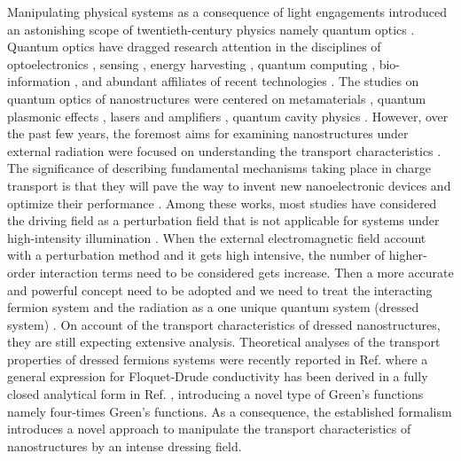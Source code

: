 
Manipulating physical systems as a consequence of light engagements introduced an astonishing scope of twentieth-century physics namely quantum optics \cite{grynberg10}.
Quantum optics have dragged research attention in the disciplines of optoelectronics \cite{liu16,wijesekara20,tao21}, sensing \cite{rodrigo2015,pirandola18,hapuarachchi2018}, energy harvesting \cite{yuan16,sun18},
quantum computing \cite{huh15,slussarenko19,andersen21}, bio-information \cite{marais18,bian20}, and abundant affiliates of recent technologies \cite{rivera20}.
The studies on quantum optics of nanostructures were centered on metamaterials \cite{shalaev07,si14}, quantum plasmonic effects \cite{hapuarachchi19,perera20}, lasers and amplifiers \cite{zhang05,chow13}, quantum cavity physics \cite{tsang10,devi20}.
However, over the past few years, the foremost aims for examining nanostructures under external radiation were focused on understanding the transport characteristics \cite{kitagawa11,zhou11,kibis14,pervishko15,morina15,dehghani15,dini16,wackerl20}. 
The significance of describing fundamental mechanisms taking place in charge transport is that they will pave the way to invent new nanoelectronic devices and optimize their performance \cite{premaratne21}.
Among these works, most studies have considered the driving field as a perturbation field \cite{pervishko15,morina15} that is not applicable for systems under high-intensity illumination \cite{grifoni98,wackerl20}. When the external electromagnetic field account with a perturbation method and it gets high intensive, the number of higher-order interaction terms need to be considered gets increase. Then a more accurate and powerful concept need to be adopted and we need to treat the interacting fermion system and the radiation as a one unique quantum system (dressed system) \cite{morina15,cohen98,scully01}. On account of the transport characteristics of dressed nanostructures, they are still expecting extensive analysis.
Theoretical analyses of the transport properties of dressed fermions systems were recently reported in Ref. \cite{kibis14,morina15,wackerl20} where a general expression for Floquet-Drude conductivity has been derived in a fully closed analytical form in Ref. \cite{wackerl20}, introducing a novel type of Green’s functions namely four-times Green’s functions. As a consequence, the established formalism introduces a novel approach to manipulate the transport characteristics of nanostructures by an intense dressing field.

